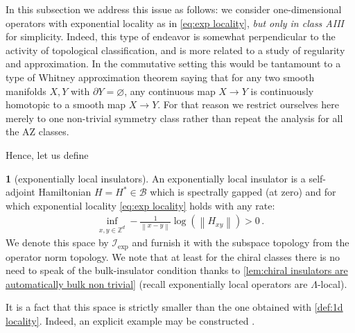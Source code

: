 \documentclass[a4paper,10pt]{article}
\numberwithin{equation}{section}
\theoremstyle{plain}
\theoremstyle{plain}
\theoremstyle{plain}
\theoremstyle{plain}
\theoremstyle{plain}
\theoremstyle{remark}
\theoremstyle{definition}
\newtheorem{defn}[thm]{\protect\definitionname}
\theoremstyle{plain}
\providecommand{\definitionname}{Definition}
\newcommand{\ZZ}{\mathbb{Z}}
\newcommand{\calB}{\mathcal{B}}
\newcommand{\calI}{\mathcal{I}}
\newcommand\norm[1]{\left\lVert#1\right\rVert}
\newcommand{\eq}[1]{\begin{align*}#1\end{align*}}
\begin{document}
	In this subsection we address this issue as follows: we consider one-dimensional operators with exponential locality as in \cref{eq:exp locality}, \emph{but only in class AIII} for simplicity. Indeed, this type of endeavor is somewhat perpendicular to the activity of topological classification, and is more related to a study of regularity and approximation. In the commutative setting this would be tantamount to a type of Whitney approximation theorem saying that for any two smooth manifolds $X,Y$ with $\partial Y = \varnothing$, any continuous map $X\to Y$ is continuously homotopic to a smooth map $X\to Y$. For that reason we restrict ourselves here merely to one non-trivial symmetry class rather than repeat the analysis for all the AZ classes.
	
	Hence, let us define 
	\begin{defn}[exponentially local insulators] An exponentially local insulator is a self-adjoint Hamiltonian $H=H^\ast\in\calB$ which is spectrally gapped (at zero) and for which exponential locality \cref{eq:exp locality} holds with any rate:\eq{\inf_{x,y\in\ZZ^d}-\frac{1}{\norm{x-y}}\log\left(\norm{H_{xy}}\right)>0\,.}
		We denote this space by $\calI_{\mathrm{exp}}$ and furnish it with the subspace topology from the operator norm topology. We note that at least for the chiral classes there is no need to speak of the bulk-insulator condition thanks to \cref{lem:chiral insulators are automatically bulk non trivial} (recall exponentially local operators are $\Lambda$-local).
	\end{defn}
	It is a fact that this space is strictly smaller than the one obtained with \cref{def:1d locality}. Indeed, an explicit example may be constructed \cite[Example 3.3.10]{Geib2022}.
	
\end{document}
